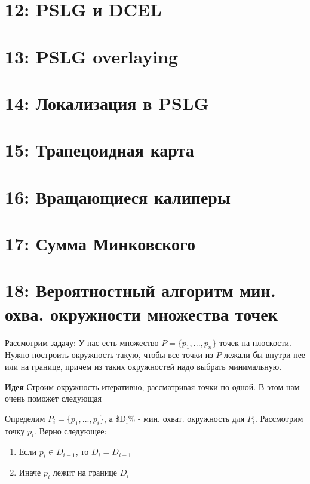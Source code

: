 \documentclass[11pt]{article}
\begin{document}
\section{{\bfseries{}} 12: PSLG и DCEL}
\label{sec:orgheadline42}
\section{{\bfseries{}} 13: PSLG overlaying}
\label{sec:orgheadline43}
\section{{\bfseries{}} 14: Локализация в PSLG}
\label{sec:orgheadline44}
\section{{\bfseries{}} 15: Трапецоидная карта}
\label{sec:orgheadline45}
\section{{\bfseries{}} 16: Вращающиеся калиперы}
\label{sec:orgheadline46}
\section{{\bfseries{}} 17: Сумма Минковского}
\label{sec:orgheadline47}
\section{{\bfseries{}} 18: Вероятностный алгоритм мин. охва. окружности множества точек}
\label{sec:orgheadline48}
Рассмотрим задачу:
У нас есть множество \(P = \{p_1, ..., p_n\}\) точек на плоскости. Нужно построить окружность такую,
чтобы все точки из \(P\) лежали бы внутри нее или на границе, причем из таких окружностей надо выбрать минимальную.

\textbf{Идея}
Строим окружность итеративно, рассматривая точки по одной. В этом нам очень поможет следующая

\begin{lemma}
Определим \(P_i = \{p_1, ..., p_i\}\), а \$D\(_{\text{i}}\)\% - мин. охват. окружность для \(P_i\).
Рассмотрим точку \(p_i\). Верно следующее:
\begin{enumerate}
\item Если \(p_i \in D_{i-1}\), то \(D_i = D_{i-1}\)
\item Иначе \(p_i\) лежит на границе \(D_i\)
\end{enumerate}
\end{lemma}
\end{document}
